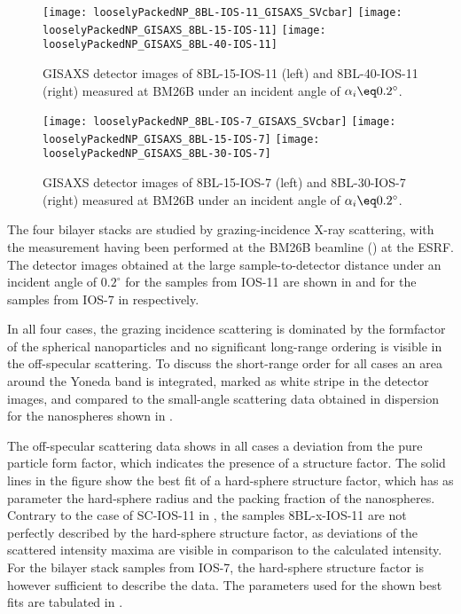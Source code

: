 \documentclass[\main/dresen_thesis.tex]{subfiles}
\begin{document}
  \label{sec:looselyPackedNS:bilayerStacks:gisaxs}
  \begin{figure}[tb]
    \centering
    \texttt{[image: looselyPackedNP\_8BL-IOS-11\_GISAXS\_SVcbar]}
    \texttt{[image: looselyPackedNP\_GISAXS\_8BL-15-IOS-11]}
    \texttt{[image: looselyPackedNP\_GISAXS\_8BL-40-IOS-11]}
    \caption{\label{fig:looselyPackedNP:bilayerStacks:gisaxs8BL_IOS_11}GISAXS detector images of 8BL-15-IOS-11 (left)  and 8BL-40-IOS-11 (right) measured at BM26B under an incident angle of $\alpha_i \eq 0.2 ^\circ$.}
  \end{figure}

  \begin{figure}[tb]
    \centering
    \texttt{[image: looselyPackedNP\_8BL-IOS-7\_GISAXS\_SVcbar]}
    \texttt{[image: looselyPackedNP\_GISAXS\_8BL-15-IOS-7]}
    \texttt{[image: looselyPackedNP\_GISAXS\_8BL-30-IOS-7]}
    \caption{\label{fig:looselyPackedNP:bilayerStacks:gisaxs8BL_IOS_7}GISAXS detector images of 8BL-15-IOS-7 (left)  and 8BL-30-IOS-7 (right) measured at BM26B under an incident angle of $\alpha_i \eq 0.2 ^\circ$.}
  \end{figure}

  The four bilayer stacks are studied by grazing-incidence X-ray scattering, with the measurement having been performed at the BM26B beamline () at the ESRF.
  The detector images obtained at the large sample-to-detector distance under an incident angle of $0.2 ^\circ$ for the samples from IOS-11 are shown in  and for the samples from IOS-7 in  respectively.

  In all four cases, the grazing incidence scattering is dominated by the formfactor of the spherical nanoparticles and no significant long-range ordering is visible in the off-specular scattering.
  To discuss the short-range order for all cases an area around the Yoneda band is integrated, marked as white stripe in the detector images, and compared to the small-angle scattering data obtained in dispersion for the nanospheres shown in .

  The off-specular scattering data shows in all cases a deviation from the pure particle form factor, which indicates the presence of a structure factor.
  The solid lines in the figure show the best fit of a hard-sphere structure factor, which has as parameter the hard-sphere radius and the packing fraction of the nanospheres.
  Contrary to the case of SC-IOS-11 in , the samples 8BL-x-IOS-11 are not perfectly described by the hard-sphere structure factor, as deviations of the scattered intensity maxima are visible in comparison to the calculated intensity.
  For the bilayer stack samples from IOS-7, the hard-sphere structure factor is however sufficient to describe the data.
  The parameters used for the shown best fits are tabulated in .
\end{document}
